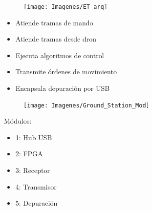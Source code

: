 \documentclass[a4,landscpae]{seminar}
\begin{document}
\begin{hslide}
\begin{minipage}{3cm}
	\begin{center}
		\begin{figure}
			\texttt{[image: Imagenes/ET\_arq]}
		\end{figure}
	\end{center}
\end{minipage} \vfill
\begin{minipage}{20cm}
	\begin{minipage}{5.2cm}
		\begin{itemize}
			\item Atiende tramas de mando
			\item Atiende tramas desde dron
			\item Ejecuta algoritmos de control
		\end{itemize}
	\end{minipage}
	\begin{minipage}{6cm}
		\begin{itemize}
			\item Transmite \'ordenes de movimiento
			\item Encapsula depuraci\'on por USB
		\end{itemize}
	\end{minipage}
\end{minipage} \vfill
\end{hslide}
\begin{hslide}
\begin{minipage}{3cm}
	\begin{center}
		\begin{figure}
			\texttt{[image: Imagenes/Ground\_Station\_Mod]}
		\end{figure}
	\end{center}
\end{minipage} \hfill
\begin{minipage}{2.8cm}
	M\'odulos:
	\begin{itemize}
		\item 1: Hub USB
		\item 2: FPGA
		\item 3: Receptor
		\item 4: Transmisor
		\item 5: Depuraci\'on
	\end{itemize}
\end{minipage}
\end{hslide}
\end{document}
